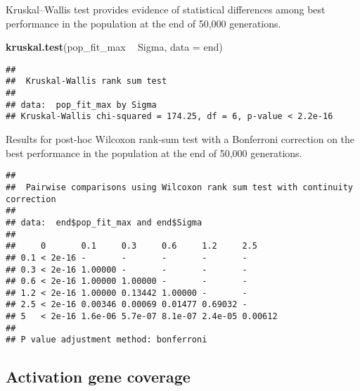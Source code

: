 \documentclass[]{book}
\newenvironment{Shaded}{\begin{snugshade}}{\end{snugshade}}
\newcommand{\DataTypeTok}[1]{\textcolor[rgb]{0.13,0.29,0.53}{#1}}
\newcommand{\KeywordTok}[1]{\textcolor[rgb]{0.13,0.29,0.53}{\textbf{#1}}}
\newcommand{\NormalTok}[1]{#1}
\newcommand{\OperatorTok}[1]{\textcolor[rgb]{0.81,0.36,0.00}{\textbf{#1}}}
\newcommand{\OtherTok}[1]{\textcolor[rgb]{0.56,0.35,0.01}{#1}}
\newcommand{\StringTok}[1]{\textcolor[rgb]{0.31,0.60,0.02}{#1}}
\begin{document}
Kruskal--Wallis test provides evidence of statistical differences among best performance in the population at the end of 50,000 generations.

\begin{Shaded}
\begin{Highlighting}[]
\KeywordTok{kruskal.test}\NormalTok{(pop_fit_max }\OperatorTok{~}\StringTok{ }\NormalTok{Sigma, }\DataTypeTok{data =}\NormalTok{ end)}
\end{Highlighting}
\end{Shaded}

\begin{verbatim}
## 
##  Kruskal-Wallis rank sum test
## 
## data:  pop_fit_max by Sigma
## Kruskal-Wallis chi-squared = 174.25, df = 6, p-value < 2.2e-16
\end{verbatim}

Results for post-hoc Wilcoxon rank-sum test with a Bonferroni correction on the best performance in the population at the end of 50,000 generations.

\begin{Shaded}
\end{Shaded}

\begin{verbatim}
## 
##  Pairwise comparisons using Wilcoxon rank sum test with continuity correction 
## 
## data:  end$pop_fit_max and end$Sigma 
## 
##     0       0.1     0.3     0.6     1.2     2.5    
## 0.1 < 2e-16 -       -       -       -       -      
## 0.3 < 2e-16 1.00000 -       -       -       -      
## 0.6 < 2e-16 1.00000 1.00000 -       -       -      
## 1.2 < 2e-16 1.00000 0.13442 1.00000 -       -      
## 2.5 < 2e-16 0.00346 0.00069 0.01477 0.69032 -      
## 5   < 2e-16 1.6e-06 5.7e-07 8.1e-07 2.4e-05 0.00612
## 
## P value adjustment method: bonferroni
\end{verbatim}

\hypertarget{activation-gene-coverage-11}{%
\subsection{Activation gene coverage}\label{activation-gene-coverage-11}}
\end{document}
